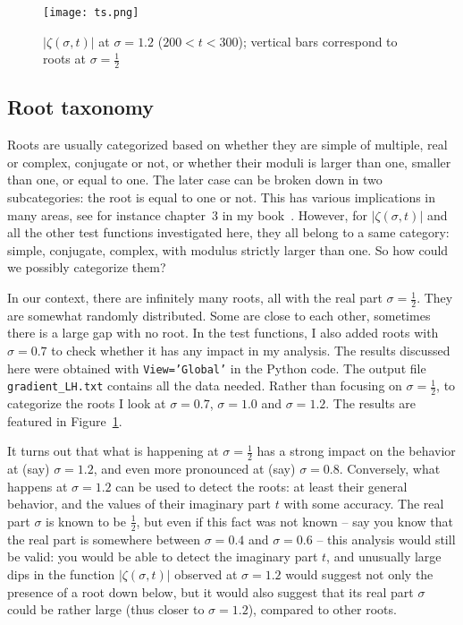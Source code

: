 \documentclass[oneside,10pt]{book}
\begin{document}
\begin{figure}%
\centering
\texttt{[image: ts.png]} %
\caption{$|\zeta(\sigma,t)|$  at $\sigma=1.2$ ($200<t<300$); vertical bars correspond to roots at $\sigma=\frac{1}{2}$}
\label{fig:ts}
\end{figure}


\subsection{Root taxonomy}\label{oaqwzx}

Roots are usually categorized based on whether they are simple of multiple, real or complex, conjugate or not, or whether their moduli is larger than one, smaller than one, or equal to one. The later case can be broken down in two subcategories: the root is equal to one or not. This has various implications in many areas, see for instance chapter~3 in my book~\cite{vgelsevier}. However, for 
$|\zeta(\sigma,t)|$ and all the other test functions investigated here, they all belong to a same category: simple, conjugate, complex, with modulus strictly larger than one. So how could we possibly categorize them?

In our context, there are infinitely many roots, all with the real part $\sigma = \frac{1}{2}$. They are somewhat randomly distributed. Some are close to each other, sometimes there is a large gap with no root. In the test functions, I also added roots with $\sigma = 0.7$ to check whether it has any impact in my analysis. The results discussed here were obtained with \texttt{View='Global'} in the Python code. The
 output file \texttt{gradient\_LH.txt} contains all the data needed. Rather than focusing on $\sigma=\frac{1}{2}$, to categorize the roots I look at
 $\sigma = 0.7$, $\sigma = 1.0$ and $\sigma =1.2$. The results are featured in Figure~\ref{fig:ts}. 

It turns out that what is happening at $\sigma=\frac{1}{2}$ has a strong impact on the behavior at (say) $\sigma=1.2$, and even more pronounced at (say) $\sigma=0.8$. Conversely, what happens at $\sigma=1.2$ can be used to detect the roots: at least their general behavior, and the values of their imaginary part $t$ with some accuracy. The real part $\sigma$ is known to be $\frac{1}{2}$, but even if this fact was not known -- say you know that the real part is somewhere between $\sigma=0.4$ and $\sigma=0.6$ -- this analysis would still be valid: you would be able to detect the imaginary part $t$, and unusually large dips in the function $|\zeta(\sigma, t)|$ observed at $\sigma=1.2$ would suggest not only the presence of a root down below, but it would also suggest that its real part $\sigma$ could be rather large (thus closer to $\sigma=1.2$), compared to other roots.  
\end{document}

